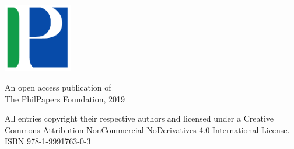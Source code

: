     \begin{center}
        \large

        \hfill

        \vspace{6em}

        \begingroup
            \color{Maroon}\spacedallcaps{\myTitle} \\ \bigskip
        \endgroup

        \textls[120]{\scshape \myName}

        \vspace{10em}

        \includegraphics[width=3cm]{PhilPapers} \\ \medskip


        An open access publication of\\
        The PhilPapers Foundation, 2019
        
        
        \vfill

        {\small All entries copyright \textcopyright\xspace their respective authors and licensed under a Creative 
        Commons Attribution-NonCommercial-NoDerivatives 4.0 International License.\\
        \bigskip
        ISBN 978-1-9991763-0-3}

    \thispagestyle{empty}
    \end{center}
